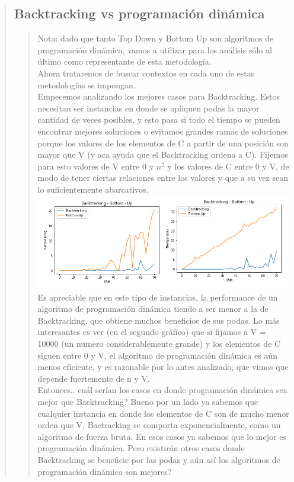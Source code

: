 \documentclass[8pt,a4paper]{article}
\begin{document}
\begin{verse}
\subsection{Backtracking vs programación dinámica}
\begin{verse}
Nota: dado que tanto Top Down y Bottom Up son algoritmos de programación dinámica, vamos a utilizar para los análisis sólo al último como representante de esta metodología.\\
Ahora trataremos de buscar contextos en cada uno de estas metodologías se impongan.\\
Empecemos analizando los mejores casos para Backtracking. Estos necesitan ser instancias en donde se apliquen podas la mayor cantidad de veces posibles, y esto pasa si todo el tiempo se pueden encontrar mejores soluciones o evitamos grandes ramas de soluciones porque los valores de los elementos de C a partir de una posición son mayor que V (y aca ayuda que el Backtracking ordena a C). Fijemos para esto  valores de V entre 0 y $n^{2}$ y los valores de C entre 0 y V, de modo de tener ciertas relaciones entre los valores y que a su vez sean lo suficientemente abarcativos.
\includegraphics[scale=.8]{buvsbt.png}	
Es apreciable que en este tipo de instancias, la performance de un algoritmo de programación dinámica tiende a ser menor a la de Backtracking, que obtiene muchos beneficios de sus podas. Lo más interesantes es ver (en el segundo gráfico) que si fijamos a V = 10000 (un numero considerablemente grande) y los elementos de C siguen entre 0 y V, el algoritmo de programación dinámica es aún menos eficiente, y es razonable por lo antes analizado, que vimos que depende fuertemente de n y V.\\
Entonces.. cuál serían los casos en donde programación dinámica sea mejor que Backtracking? Bueno por un lado ya sabemos que cualquier instancia en donde los elementos de C son de mucho menor orden que V, Bactracking se comporta exponencialmente, como un algoritmo de fuerza bruta. En esos casos ya sabemos que lo mejor es programación dinámica. Pero existirán otros casos donde Backtracking se beneficie por las podas y aún así los algoritmos de programación dinámica son mejores?\\

\end{verse}
\end{verse}
\end{document}
